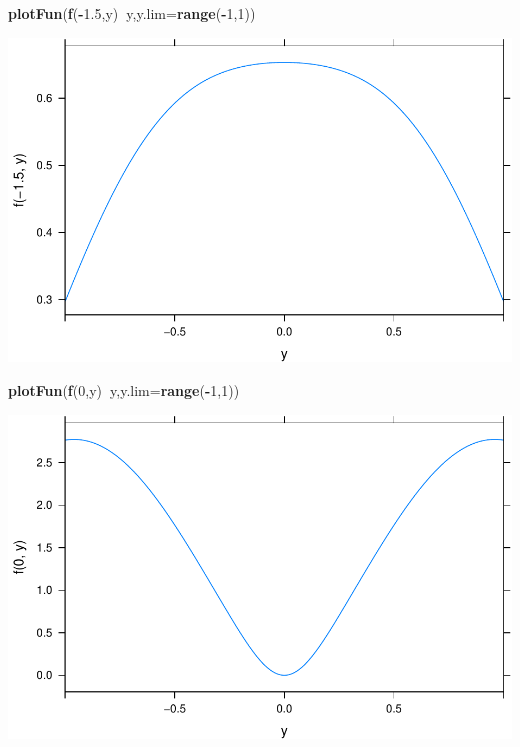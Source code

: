 \documentclass[
]{book}
\newenvironment{Shaded}{\begin{snugshade}}{\end{snugshade}}
\newcommand{\DataTypeTok}[1]{\textcolor[rgb]{0.13,0.29,0.53}{#1}}
\newcommand{\DecValTok}[1]{\textcolor[rgb]{0.00,0.00,0.81}{#1}}
\newcommand{\FloatTok}[1]{\textcolor[rgb]{0.00,0.00,0.81}{#1}}
\newcommand{\KeywordTok}[1]{\textcolor[rgb]{0.13,0.29,0.53}{\textbf{#1}}}
\newcommand{\NormalTok}[1]{#1}
\newcommand{\OperatorTok}[1]{\textcolor[rgb]{0.81,0.36,0.00}{\textbf{#1}}}
\begin{document}
\begin{Shaded}
\begin{Highlighting}[]
\KeywordTok{plotFun}\NormalTok{(}\KeywordTok{f}\NormalTok{(}\OperatorTok{-}\FloatTok{1.5}\NormalTok{,y)}\OperatorTok{~}\NormalTok{y,}\DataTypeTok{y.lim=}\KeywordTok{range}\NormalTok{(}\OperatorTok{-}\DecValTok{1}\NormalTok{,}\DecValTok{1}\NormalTok{))}
\end{Highlighting}
\end{Shaded}

\includegraphics{_bookdown_files/math135_handbook_files/figure-latex/unnamed-chunk-80-1.pdf}

\begin{Shaded}
\begin{Highlighting}[]
\KeywordTok{plotFun}\NormalTok{(}\KeywordTok{f}\NormalTok{(}\DecValTok{0}\NormalTok{,y)}\OperatorTok{~}\NormalTok{y,}\DataTypeTok{y.lim=}\KeywordTok{range}\NormalTok{(}\OperatorTok{-}\DecValTok{1}\NormalTok{,}\DecValTok{1}\NormalTok{))}
\end{Highlighting}
\end{Shaded}

\includegraphics{_bookdown_files/math135_handbook_files/figure-latex/unnamed-chunk-80-2.pdf}
\end{document}
